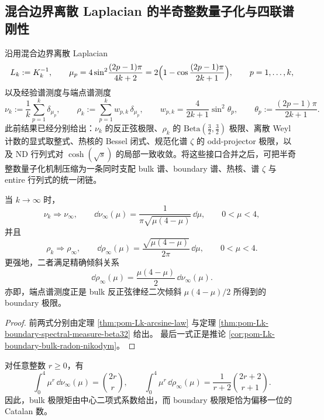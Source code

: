 \subsection{混合边界离散 Laplacian 的半奇整数量子化与四联谱刚性}\label{subsec:conclusion-halfodd-laplacian-bulkboundary-bessel-oddprojector-cosh}
沿用混合边界离散 Laplacian
\[
L_k:=K_k^{-1},
\qquad
\mu_p
=4\sin^2\!\frac{(2p-1)\pi}{4k+2}
=2\Bigl(1-\cos\frac{(2p-1)\pi}{2k+1}\Bigr),
\qquad p=1,\dots,k,
\]
以及经验谱测度与端点谱测度
\[
\nu_k:=\frac1k\sum_{p=1}^k\delta_{\mu_p},
\qquad
\rho_k:=\sum_{p=1}^k w_{p,k}\,\delta_{\mu_p},
\qquad
w_{p,k}=\frac{4}{2k+1}\sin^2\theta_p,
\qquad
\theta_p:=\frac{(2p-1)\pi}{2k+1}.
\]
此前结果已经分别给出：\(\nu_k\) 的反正弦极限、\(\rho_k\) 的 \(\mathrm{Beta}(\tfrac32,\tfrac32)\) 极限、离散 Weyl 计数的显式取整式、热核的 Bessel 闭式、规范化谱 \(\zeta\) 的 odd-projector 极限，以及 ND 行列式对 \(\cosh(\sqrt{s})\) 的局部一致收敛。将这些接口合并之后，可把半奇整数量子化机制压缩为一条同时支配 bulk 谱、boundary 谱、热核、谱 \(\zeta\) 与 entire 行列式的统一闭链。

\begin{theorem}\label{thm:conclusion-Lk-bulk-boundary-quadratic-tilt}
当 \(k\to\infty\) 时，
\[
\nu_k\Rightarrow \nu_\infty,
\qquad
\dd\nu_\infty(\mu)=\frac{1}{\pi\sqrt{\mu(4-\mu)}}\,\dd\mu,
\qquad 0<\mu<4,
\]
并且
\[
\rho_k\Rightarrow \rho_\infty,
\qquad
\dd\rho_\infty(\mu)=\frac{\sqrt{\mu(4-\mu)}}{2\pi}\,\dd\mu,
\qquad 0<\mu<4.
\]
更强地，二者满足精确倾斜关系
\[
\dd\rho_\infty(\mu)=\frac{\mu(4-\mu)}{2}\,\dd\nu_\infty(\mu).
\]
亦即，端点谱测度正是 bulk 反正弦律经二次倾斜 \(\mu(4-\mu)/2\) 所得到的 boundary 极限。
\end{theorem}

\begin{proof}
前两式分别由定理 \ref{thm:pom-Lk-arcsine-law} 与定理 \ref{thm:pom-Lk-boundary-spectral-measure-beta32} 给出。
最后一式正是推论 \ref{cor:pom-Lk-boundary-bulk-radon-nikodym}。
\end{proof}

\begin{corollary}\label{cor:conclusion-Lk-central-binomial-catalan-moments}
对任意整数 \(r\ge 0\)，有
\[
\int_0^4 \mu^r\,\dd\nu_\infty(\mu)=\binom{2r}{r},
\qquad
\int_0^4 \mu^r\,\dd\rho_\infty(\mu)=\frac{1}{r+2}\binom{2r+2}{r+1}.
\]
因此，bulk 极限矩由中心二项式系数给出，而 boundary 极限矩恰为偏移一位的 Catalan 数。
\end{corollary}

